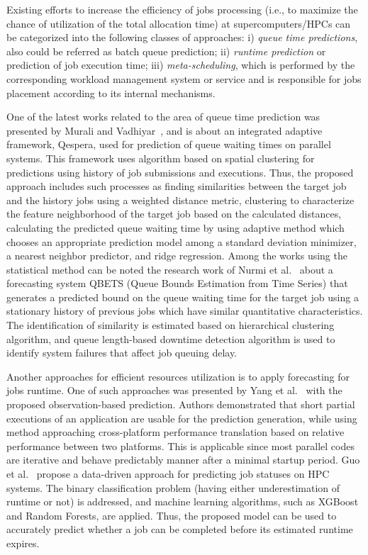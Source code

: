 Existing efforts to increase the efficiency of jobs processing (i.e., to
maximize the chance of utilization of the total allocation time) at
supercomputers/HPCs can be categorized into the following classes of
approaches: i) \textit{queue time predictions}, also could be referred as
batch queue prediction; ii) \textit{runtime prediction} or prediction of job
execution time; iii) \textit{meta-scheduling}, which is performed by the
corresponding workload management system or service and is responsible for
jobs placement according to its internal mechanisms.

One of the latest works related to the area of queue time prediction was presented by Murali and Vadhiyar~\cite{ref-qespera}, and is about an integrated adaptive framework, Qespera, used for prediction of queue waiting times on parallel systems. This framework uses algorithm based on spatial clustering for predictions using history of job submissions and executions. Thus, the proposed approach includes such processes as finding similarities between the target job and the history jobs using a weighted distance metric, clustering to characterize the feature neighborhood of the target job based on the calculated distances, calculating the predicted queue waiting time by using adaptive method which chooses an appropriate prediction model among a standard deviation minimizer, a nearest neighbor predictor, and ridge regression. Among the works using the statistical method can be noted the research work of Nurmi et al.~\cite{ref-qbets} about a forecasting system QBETS (Queue Bounds Estimation from Time Series) that generates a predicted bound on the queue waiting time for the target job using a stationary history of previous jobs which have similar quantitative characteristics. The identification of similarity is estimated based on hierarchical clustering algorithm, and queue length-based downtime detection algorithm is used to identify system failures that affect job queuing delay.

Another approaches for efficient resources utilization is to apply forecasting for jobs runtime. One of such approaches was presented by Yang et al.~\cite{ref-yang} with the proposed observation-based prediction. Authors demonstrated that short partial executions of an application are usable for the prediction generation, while using method approaching cross-platform performance translation based on relative performance between two platforms. This is applicable since most parallel codes are iterative and behave predictably manner after a minimal startup period. Guo et al.~\cite{ref-guo} propose a data-driven approach for predicting job statuses on HPC systems. The binary classification problem (having either underestimation of runtime or not) is addressed, and machine learning algorithms, such as XGBoost and Random Forests, are applied. Thus, the proposed model can be used to accurately predict whether a job can be completed before its estimated runtime expires.

